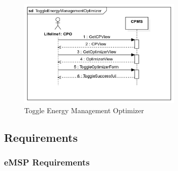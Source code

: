 \documentclass{Configuration_Files/PoliMi3i_thesis}
\begin{document}
\begin{figure}[H]
    \centering
    \includegraphics[width=0.7\textwidth]{Images/UseCases/ToggleEnergyManagementOptimizer.jpg}
    \caption{Toggle Energy Management Optimizer}
\end{figure}

\newpage\subsection{Requirements}

    \subsubsection{eMSP Requirements}
\end{document}
